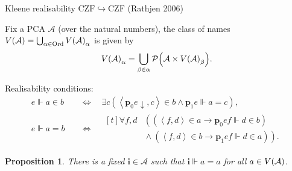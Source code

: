 \documentclass{beamer}
\newtheorem{proposition}{Proposition}
\theoremstyle{definition}
\newcommand{\tuple}[1]{\left\langle #1 \right\rangle}
\newcommand{\CZF}{\mathrm{CZF}}
\newcommand{\Ord}{\mathrm{Ord}}
\begin{document}
\begin{frame}{Kleene realisability $\CZF \hookrightarrow \CZF$ (Rathjen 2006)}
  \nocite{rathjen06-czf-realizability}

  Fix a PCA $\mathcal{A}$ (over the natural numbers), the class of names $V\mleft(\mathcal{A}\mright) = \bigcup_{\alpha \in \Ord} V\mleft(\mathcal{A}\mright)_\alpha$ is given by
  \[V\mleft(\mathcal{A}\mright)_\alpha = \bigcup_{\beta \in \alpha} \mathcal{P}\mleft(\mathcal{A} \times V\mleft(\mathcal{A}\mright)_\beta\mright).\]

  \pause

  Realisability conditions:
  \begin{align*}
    e \Vdash a \in b \quad & \Leftrightarrow \quad \exists c \left(\tuple{\mathbf{p}_0e {\downarrow}, c} \in b \land \mathbf{p}_1e \Vdash a = c\right), \\
    e \Vdash a = b \quad   & \Leftrightarrow \quad \begin{aligned}[t]
                                                     \forall f, d & \left(\left(\tuple{f, d} \in a \rightarrow \mathbf{p}_0ef \Vdash d \in b\right)\right.           \\
                                                                  & \left.{} \land \left(\tuple{f, d} \in b \rightarrow \mathbf{p}_1ef \Vdash d \in a\right)\right).
                                                   \end{aligned}
  \end{align*}

  \vspace{-1em}
  \begin{proposition}
    There is a fixed $\mathbf{i} \in \mathcal{A}$ such that $\mathbf{i} \Vdash a = a$ for all $a \in V\mleft(\mathcal{A}\mright)$.
  \end{proposition}
\end{frame}
\end{document}
